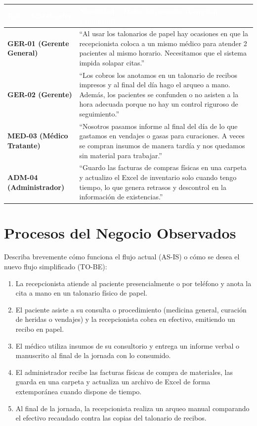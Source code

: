\begin{longtable}{>{\bfseries}p{}p{}}
\toprule
\rowcolor{azulprincipal}\textcolor{white}{Ref. / Stakeholder} & \textcolor{white}{Necesidad / Dolor Expresado (Lenguaje Coloquial)}\\
\midrule
GER-01 (Gerente General) & ``Al usar los talonarios de papel hay ocasiones en que la recepcionista coloca a un mismo médico para atender 2 pacientes al mismo horario. Necesitamos que el sistema impida solapar citas.''\\
GER-02 (Gerente) & ``Los cobros los anotamos en un talonario de recibos impresos y al final del día hago el arqueo a mano. Además, los pacientes se confunden o no asisten a la hora adecuada porque no hay un control riguroso de seguimiento.''\\
MED-03 (Médico Tratante) & ``Nosotros pasamos informe al final del día de lo que gastamos en vendajes o gasas para curaciones. A veces se compran insumos de manera tardía y nos quedamos sin material para trabajar.''\\
ADM-04 (Administrador) & ``Guardo las facturas de compras físicas en una carpeta y actualizo el Excel de inventario solo cuando tengo tiempo, lo que genera retrasos y descontrol en la información de existencias.''\\
\bottomrule
\end{longtable}

\section{Procesos del Negocio Observados}

Describa brevemente cómo funciona el flujo actual (AS-IS) o cómo se desea el nuevo flujo simplificado (TO-BE):

\begin{enumerate}[leftmargin=0pt,label={},itemindent=0pt]
    \item[\textbf{Paso 1:}] La recepcionista atiende al paciente presencialmente o por teléfono y anota la cita a mano en un talonario físico de papel.
    \item[\textbf{Paso 2:}] El paciente asiste a su consulta o procedimiento (medicina general, curación de heridas o vendajes) y la recepcionista cobra en efectivo, emitiendo un recibo en papel.
    \item[\textbf{Paso 3:}] El médico utiliza insumos de su consultorio y entrega un informe verbal o manuscrito al final de la jornada con lo consumido.
    \item[\textbf{Paso 4:}] El administrador recibe las facturas físicas de compra de materiales, las guarda en una carpeta y actualiza un archivo de Excel de forma extemporánea cuando dispone de tiempo.
    \item[\textbf{Paso 5:}] Al final de la jornada, la recepcionista realiza un arqueo manual comparando el efectivo recaudado contra las copias del talonario de recibos.
\end{enumerate}

